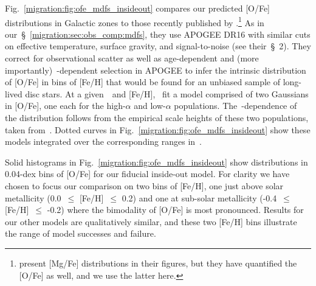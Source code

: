 Fig.~\ref{migration:fig:ofe_mdfs_insideout} compares our predicted [O/Fe] distributions 
in Galactic zones to those recently published by 
\citet{Vincenzo2021a}.\footnote{
	\citet{Vincenzo2021a} present [Mg/Fe] distributions in their figures, but 
	they have quantified the [O/Fe] as well, and we use the latter here. 
}
As in our~\S~\ref{migration:sec:obs_comp:mdfs}, they use APOGEE DR16 with similar cuts on 
effective temperature, surface gravity, and signal-to-noise (see their~\S~2). 
They correct for observational scatter as well as age-dependent and (more 
importantly)~\absz-dependent selection in APOGEE to infer the intrinsic 
distribution of [O/Fe] in bins of [Fe/H] that would be found for an unbiased 
sample of long-lived disc stars. 
At a given~\rgal~and [Fe/H],~\citet{Vincenzo2021a} fit a model comprised of two 
Gaussians in [O/Fe], one each for the high-$\alpha$ and low-$\alpha$ 
populations.
The~\absz-dependence of the distribution follows from the empirical scale 
heights of these two populations, taken from~\citet{Bovy2016b}. 
Dotted curves in Fig.~\ref{migration:fig:ofe_mdfs_insideout} show these models integrated 
over the corresponding ranges in~\absz. 
\par 
Solid histograms in Fig.~\ref{migration:fig:ofe_mdfs_insideout} show distributions in 
0.04-dex bins of [O/Fe] for our fiducial inside-out model. 
For clarity we have chosen to focus our comparison on two bins of [Fe/H], one 
just above solar metallicity (0.0~$\leq$ [Fe/H]~$\leq$ 0.2) and one at 
sub-solar metallicity (-0.4~$\leq$ [Fe/H]~$\leq$ -0.2) where the bimodality of 
[O/Fe] is most pronounced. Results for our other models are qualitatively 
similar, and these two [Fe/H] bins illustrate the range of model successes and 
failure. 

